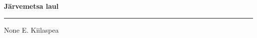\documentclass[10pt]{book}
\begin{document}
{
  \samepage
  \raggedbottom
  \raggedright
  \sloppy


  \vspace{0.2in}

  \noindent\begin{minipage}{.1\textwidth}
    \hfill\vspace{0.1in}
  \end{minipage}%
  \noindent\begin{minipage}{.8\textwidth}
    \centering
    \bfseries
    \large J\"arvemetsa laul
  \end{minipage}%
  \noindent\begin{minipage}{.1\textwidth}
      \hfill\vspace{0.1in}
  \end{minipage}

  \nopagebreak[4]
  \vspace{0.1in}
  \nopagebreak[4]
  \hrule height 0.05ex
  \nopagebreak[4]
  \vspace{-0.05in}

  {\footnotesize None \hfill E. Kiilaspea }\\
  \vspace{0.01in}


  \vspace{0.01in}
  \nopagebreak[4]
  {%
\parindent 0pt
\noindent
\ifx\preLilyPondExample \undefined
\else
  \expandafter\preLilyPondExample
\fi
\def\lilypondbook{}%

\ifx\postLilyPondExample \undefined
\else
  \expandafter\postLilyPondExample
\fi
}

}
\end{document}
